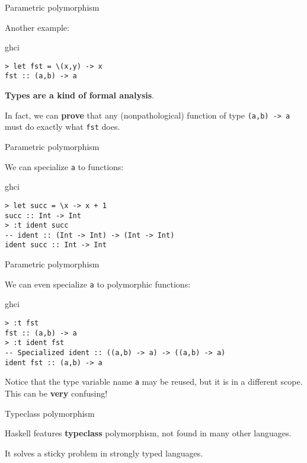 %
\begin{frame}[fragile]{Parametric polymorphism}

Another example:

\begin{block}{ghci}
\begin{verbatim}
> let fst = \(x,y) -> x
fst :: (a,b) -> a
\end{verbatim}
\end{block}

\textbf{Types are a kind of formal analysis}. 

In fact, we can \textbf{prove} that any (nonpathological) function of type
\texttt{(a,b) -> a} must do exactly what \texttt{fst} does.

\end{frame}

%
\begin{frame}[fragile]{Parametric polymorphism}

We can specialize \texttt{a} to functions:

\begin{block}{ghci}
\begin{verbatim}
> let succ = \x -> x + 1
succ :: Int -> Int
> :t ident succ
-- ident :: (Int -> Int) -> (Int -> Int)
ident succ :: Int -> Int
\end{verbatim}
\end{block}

\end{frame}

%
\begin{frame}[fragile]{Parametric polymorphism}

We can even specialize \texttt{a} to polymorphic functions:

\begin{block}{ghci}
\begin{verbatim}
> :t fst
fst :: (a,b) -> a
> :t ident fst
-- Specialized ident :: ((a,b) -> a) -> ((a,b) -> a)
ident fst :: (a,b) -> a
\end{verbatim}
\end{block}

Notice that the type variable name \texttt{a} may be reused, but it is in a
different scope. This can be \textbf{very} confusing!

\end{frame}

%
\begin{frame}[fragile]{Typeclass polymorphism}

Haskell features \textbf{typeclass} polymorphism, not found in many other
languages.

It solves a sticky problem in strongly typed languages.

\end{frame}

